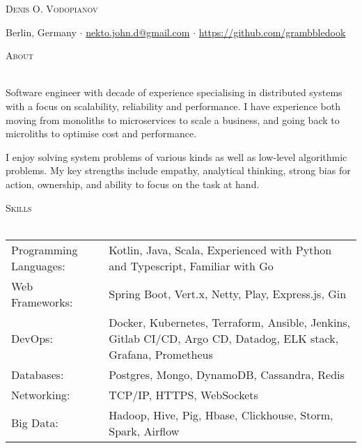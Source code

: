 \documentclass[a4paper]{article}
\makeatletter
\newcommand{\lineunder} {
    \vspace*{-8pt} \\
    \hspace*{-18pt} \hrulefill \\
}
\newcommand{\header} [1] {
        {\hspace*{-18pt}\vspace*{6pt} \textsc{#1}}
    \vspace*{-6pt} \lineunder
}
\def\email{nekto.john.d@gmail.com}
\def\phone{555-55-55}
\makeatother
\begin{document}
    \vspace*{-40pt}


    \vspace*{-10pt}
    \begin{center}
        \Huge \scshape {Denis O. Vodopianov} \\ \vspace{1mm}
    \end{center}

    \begin{center}
        Berlin, Germany $\cdot$
        \href{mailto:\email}{\email} $\cdot$
        \url{https://github.com/grambbledook}\\
    \end{center}

    \header{About}
    \begin{raggedright}
       Software engineer with decade of experience specialising in distributed systems with a focus on scalability, reliability and performance.
       I have experience both moving from monoliths to microservices to scale a business, and going back to microliths
       to optimise cost and performance. \break

       I enjoy solving system problems of various kinds as well as low-level algorithmic problems.
       My key strengths include empathy, analytical thinking, strong bias for action, ownership, and ability to focus on the task at hand.                                                 \\
    \end{raggedright}
    \vspace{2mm}

    \header{Skills}
    \begin{tabular}{V{5cm} @{\hskip 0.6cm} V{16cm}}
        Programming Languages: & Kotlin, Java,  Scala, Experienced with Python and Typescript, Familiar with Go                                 \\
        Web Frameworks:        & Spring Boot, Vert.x, Netty, Play, Express.js, Gin                                                            \\
        DevOps:                & Docker, Kubernetes, Terraform, Ansible, Jenkins, Gitlab CI/CD, Argo CD, Datadog, ELK stack, Grafana, Prometheus \\
        Databases:             & Postgres, Mongo, DynamoDB, Cassandra, Redis                                                                         \\
        Networking:            & TCP/IP, HTTPS, WebSockets                                                                                    \\
        Big Data:              & Hadoop, Hive, Pig, Hbase, Clickhouse, Storm, Spark, Airflow                                                  \\
    \end{tabular}
    \vspace{2mm}
\end{document}
